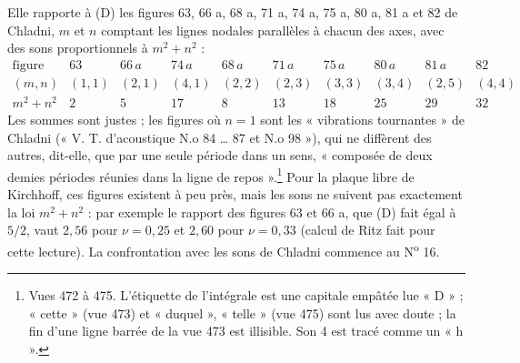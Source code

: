 \documentclass[11pt,a4paper]{article}
\begin{document}
Elle rapporte à (D) les figures 63, 66 a, 68 a, 71 a, 74 a, 75 a, 80 a, 81 a et 82 de
Chladni, $m$ et $n$ comptant les lignes nodales parallèles à chacun des axes, avec
des sons proportionnels à $m^2 + n^2$ :
\[
\begin{array}{lccccccccc}
\text{figure} & 63 & 66\,a & 74\,a & 68\,a & 71\,a & 75\,a & 80\,a & 81\,a & 82\\
(m,n) & (1,1) & (2,1) & (4,1) & (2,2) & (2,3) & (3,3) & (3,4) & (2,5) & (4,4)\\
m^2+n^2 & 2 & 5 & 17 & 8 & 13 & 18 & 25 & 29 & 32
\end{array}
\]
Les sommes sont justes ; les figures où $n = 1$ sont les « vibrations tournantes » de
Chladni (« V. T. d'acoustique N.o 84 … 87 et N.o 98 »), qui ne diffèrent des autres,
dit-elle, que par une seule période dans un sens, « composée de deux demies périodes
réunies dans la ligne de repos ».\footnote{Vues 472 à 475. L'étiquette de l'intégrale
est une capitale empâtée lue « D » ; « cette » (vue 473) et « duquel », « telle » (vue
475) sont lus avec doute ; la fin d'une ligne barrée de la vue 473 est illisible. Son 4
est tracé comme un « h ».} Pour la plaque libre de Kirchhoff, ces figures existent à
peu près, mais les sons ne suivent pas exactement la loi $m^2 + n^2$ : par exemple le
rapport des figures 63 et 66 a, que (D) fait égal à $5/2$, vaut $2{,}56$ pour
$\nu = 0{,}25$ et $2{,}60$ pour $\nu = 0{,}33$ (calcul de Ritz fait pour cette lecture).
La confrontation avec les sons de Chladni commence au N\textsuperscript{o} 16.
\end{document}
